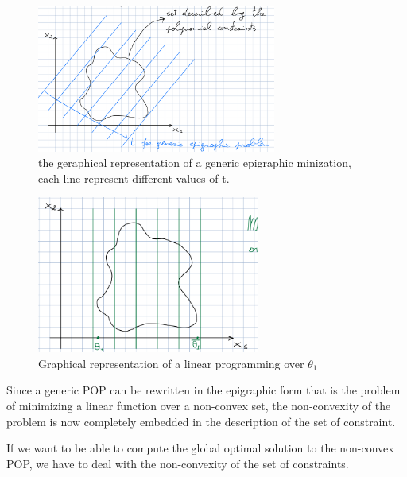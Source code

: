 \begin{figure}[htbp]  %
    \centering
    \includegraphics[width=0.7\textwidth]{images/epigraphic-mini.png}
    \caption{the geraphical representation of a generic epigraphic minization, each line represent different values of t.}
    \label{fig:non-convex-FPS}
\end{figure}

\begin{figure}[htbp]  %
    \centering
    \includegraphics[width=0.65\textwidth]{images/linprog.png}
    \caption{Graphical representation of a linear programming over $\theta_1$}
    \label{fig:non-convex-FPS}
\end{figure}
\begin{QandAbox}
Since a generic POP can be rewritten in the epigraphic form that is the problem of minimizing a linear function over a non-convex set, the non-convexity of the problem is now completely embedded in the description of the set of constraint.
\end{QandAbox}

If we want to be able to compute the global optimal solution to the non-convex POP, we have to deal with the non-convexity of the set of constraints.

